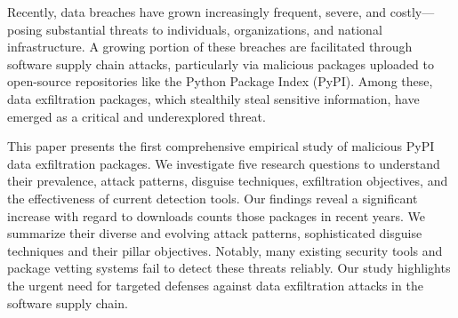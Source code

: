 

Recently, data breaches have grown increasingly frequent, severe, and costly—posing substantial threats to individuals, organizations, and national infrastructure. A growing portion of these breaches are facilitated through software supply chain attacks, particularly via malicious packages uploaded to open-source repositories like the Python Package Index (PyPI). Among these, data exfiltration packages, which stealthily steal sensitive information, have emerged as a critical and underexplored threat.

This paper presents the first comprehensive empirical study of malicious PyPI data exfiltration packages. We investigate five research questions to understand their prevalence, attack patterns, disguise techniques, exfiltration objectives, and the effectiveness of current detection tools. Our findings reveal a significant increase with regard to downloads counts those packages in recent years. We summarize their diverse and evolving attack patterns, sophisticated disguise techniques and their pillar objectives. Notably, many existing security tools and package vetting systems fail to detect these threats reliably. Our study highlights the urgent need for targeted defenses against data exfiltration attacks in the software supply chain.

